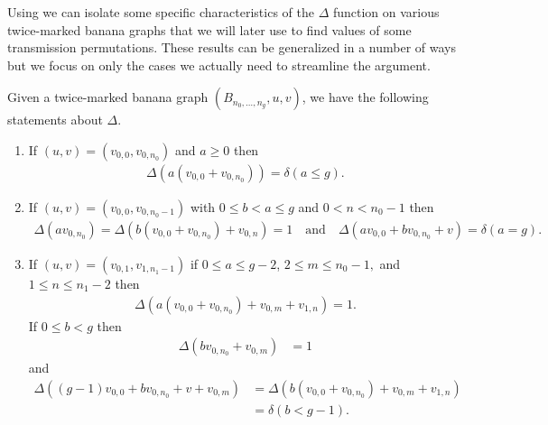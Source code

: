 Using  we can isolate some specific characteristics of the $\Delta$ function on various twice-marked banana graphs that we will later use to find values of some transmission permutations. These results can be generalized in a number of ways but we focus on only the cases we actually need to streamline the argument.
\begin{coro}\label{cor-BananaDeltaComps}
    Given a twice-marked banana graph $(B_{n_0,\dots,n_g},u,v)$, we have the following statements about $\Delta$.
    \begin{enumerate}[label = \arabic*)]
        \item If $(u,v) = (v_{0,0},v_{0,n_0})$ and $a \geq 0$ then 
        \begin{align*}
            \Delta(a(v_{0,0}+v_{0,n_0})) = \delta(a\leq g).
        \end{align*}
        \item If $(u,v) = (v_{0,0},v_{0,n_0-1})$ with $0\leq b <a \leq g$ and $0<n<n_0-1$ then
        \begin{align*}
            \Delta(av_{0,n_0}) = \Delta(b(v_{0,0}+v_{0,n_0}) + v_{0,n}) = 1 \quad \text{and} \quad \Delta(av_{0,0}+bv_{0,n_0}+v) = \delta(a = g).
        \end{align*}
        \item If $(u,v) = (v_{0,1},v_{1,n_1-1})$ if $0\leq a\leq g-2$, $2\leq m \leq n_0-1,$ and $1 \leq n \leq n_1-2$ then
        \begin{align*}
            \Delta(a(v_{0,0}+v_{0,n_0})+v_{0,m}+v_{1,n}) = 1.
        \end{align*}
        If $0 \leq b <g$ then
        \begin{align*}
            \Delta(bv_{0,n_0}+v_{0,m}) &= 1
        \end{align*} 
        and
        \begin{align*}\Delta((g-1)v_{0,0}+bv_{0,n_0}+v+v_{0,m}) &= \Delta(b(v_{0,0}+v_{0,n_0})+v_{0,m}+v_{1,n})\\&=\delta(b < g-1).
        \end{align*}
    \end{enumerate}
\end{coro}

